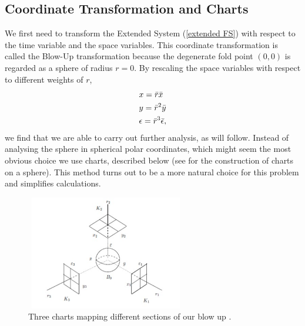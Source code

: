 \subsection{Coordinate Transformation and Charts} \label{sec:transform blowup}
We first need to transform the Extended System (\ref{extended FS}) with respect to the time variable and the space variables. This coordinate transformation is called the Blow-Up transformation because the degenerate fold point $(0,0)$ is regarded as a sphere of radius $r=0$. By rescaling the space variables with respect to different weights of $r$,\begin{subequations}
    \begin{align}
        &x=\Bar{r}\Bar{x}  \label{sys: blow up trans x}\\
        &y=\Bar{r}^2\Bar{y} \label{sys: blow up trans y}\\ 
        &\epsilon=\bar{r}^3\bar{\epsilon} \label{sys: blow up trans z},
    \end{align}  
    \label{sys: blow up trans}
\end{subequations} we find that we are able to carry out further analysis, as will follow.
Instead of analysing the sphere in spherical polar coordinates, which might seem the most obvious choice we use charts, described below (see \citet{needam} for the construction of charts on a sphere). This method turns out to be a more natural choice for this problem and simplifies calculations.
\begin{figure}[h!]
	\centering
	\includegraphics[height=5cm,width=7cm]{Images/charts-ball}
	\caption{Three charts mapping different sections of our blow up \citep{krupa2001}.}
	\label{fig:chartDiagram}
\end{figure}\newpage
